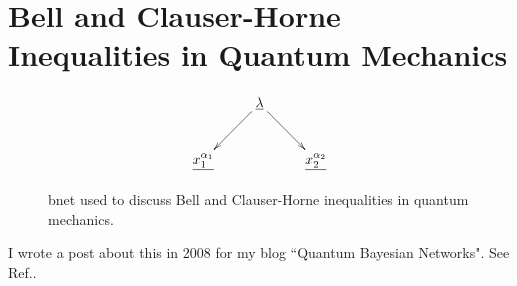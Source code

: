 \chapter{Bell  
and Clauser-Horne Inequalities 
in Quantum Mechanics}

\begin{figure}[h!]
\centering
$$\xymatrix{
&\ul{\lambda}\ar[dr]\ar[dl]&\\
\ul{x_1^{\alpha_1}}&&\ul{x_2^{\alpha_2}}
}$$
\caption{bnet used to discuss Bell 
and Clauser-Horne inequalities 
in quantum mechanics.}
\label{fig-monty}
\end{figure}

I wrote a post about
this in 2008 for
my blog ``Quantum Bayesian Networks". See Ref.\cite{bell-blog}.